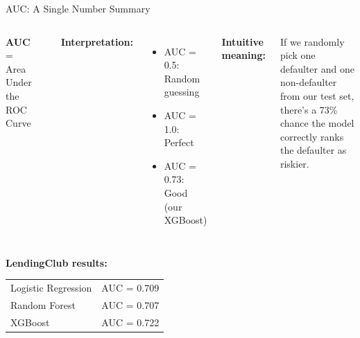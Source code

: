 \documentclass[10pt]{beamer}
\begin{document}
\begin{frame}{AUC: A Single Number Summary}

  \begin{columns}[T]
    \textbf{AUC} = Area Under the ROC Curve

    \vspace{0.5em}
    \begin{center}
    \end{center}

    \textbf{Interpretation:}
    \begin{itemize}
      \item AUC = 0.5: Random guessing
      \item AUC = 1.0: Perfect
      \item AUC = 0.73: Good (our XGBoost)
    \end{itemize}

    \vspace{0.5em}
    \textbf{Intuitive meaning:}

If we randomly pick one defaulter and one non-defaulter from our test set, there's a 73\% chance the model correctly ranks the defaulter as riskier.
  \end{columns}

  \vspace{1em}
  \textbf{LendingClub results:}
  \begin{center}
  \begin{tabular}{lc}
    Logistic Regression & AUC = 0.709 \\
    Random Forest & AUC = 0.707 \\
    XGBoost & AUC = 0.722 \\
  \end{tabular}
  \end{center}
\end{frame}
\end{document}
